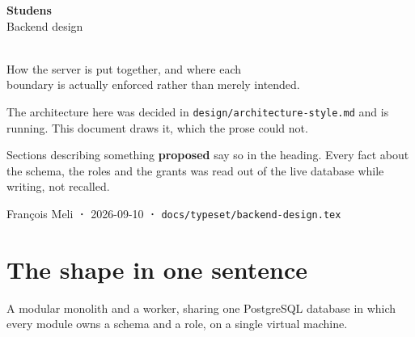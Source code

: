 \documentclass[11pt,a4paper]{article}
\begin{document}
\begin{titlepage}
\centering
\vspace*{2.2cm}
{\sffamily\fontsize{34}{40}\selectfont\bfseries\color{studens}Studens}\\[2mm]
{\sffamily\large\color{muted}Backend design}\\[10mm]
\\[10mm]
{\sffamily\normalsize How the server is put together, and where each\\
boundary is actually enforced rather than merely intended.}\\[16mm]

\begin{tcolorbox}[width=0.86\textwidth,colback=studenslt,colframe=studens,
  arc=2pt,fonttitle=\sffamily\bfseries,title={Status: mostly built}]
\sffamily\small
The architecture here was decided in \texttt{design/architecture-style.md} and
is running. This document draws it, which the prose could not.

Sections describing something \textbf{proposed} say so in the heading. Every
fact about the schema, the roles and the grants was read out of the live
database while writing, not recalled.
\end{tcolorbox}

\vfill
{\sffamily\footnotesize\color{muted}François Meli \textbf{·} 2026-09-10 \textbf{·} \texttt{docs/typeset/backend-design.tex}}
\end{titlepage}

\tableofcontents
\newpage

\section{The shape in one sentence}

A modular monolith and a worker, sharing one PostgreSQL database in which every
module owns a schema and a role, on a single virtual machine.
\end{document}

